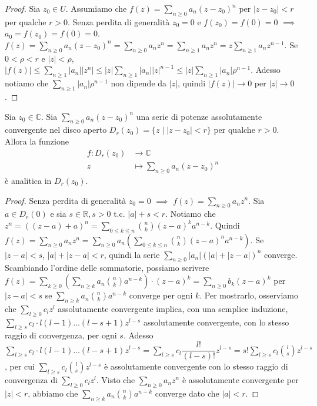 \begin{proof}
  Sia $z_0 \in U$. Assumiamo che $\displaystyle f(z)=\sum_{n \ge 0}a_n(z-z_0)^n$ per $|z-z_0|<r$ per qualche $r>0$. Senza perdita di generalità $z_0=0$ e $f(z_0)=f(0)=0$ $\implies$ $a_0=f(z_0)=f(0)=0$.
  $\displaystyle f(z)=\sum_{n \ge 0} a_n(z-z_0)^n=\sum_{n \ge 0} a_nz^n=\sum_{n \ge 1} a_nz^n=z\sum_{n \ge 1} a_nz^{n-1}$. Se $0<\rho<r$ e $|z|<\rho$, $\displaystyle |f(z)| \le \sum_{n \ge 1} |a_n||z^n| \le |z| \sum_{n \ge 1} |a_n||z|^{n-1} \le |z| \sum_{n \ge 1} |a_n| \rho^{n-1}$.
  Adesso notiamo che $\displaystyle \sum_{n \ge 1} |a_n| \rho^{n-1}$ non dipende da $|z|$, quindi $|f(z)| \longrightarrow 0$ per $|z| \longrightarrow 0$.
\end{proof}

\begin{prop}
  Sia $z_0 \in \mathbb{C}$. Sia $\displaystyle \sum_{n \ge 0} a_n(z-z_0)^n$ una serie di potenze assolutamente convergente nel disco aperto $D_r(z_0)=\{z \mid |z-z_0|<r\}$ per qualche $r>0$. Allora la funzione
  \begin{align*}
    f:D_r(z_0) &\longrightarrow \mathbb{C}\\
    z &\longmapsto \sum_{n \ge 0} a_n(z-z_0)^n
  \end{align*}
  è analitica in $D_r(z_0)$.
\end{prop}

\begin{proof}
  Senza perdita di generalità $z_0=0$ $\implies$ $\displaystyle f(z)=\sum_{n \ge 0} a_nz^n$. Sia $a \in D_r(0)$ e sia $s \in \mathbb{R}, s>0$ t.c. $|a|+s<r$. Notiamo che $\displaystyle z^n=((z-a)+a)^n=\displaystyle \sum_{0 \le k \le n} \binom{n}{k}(z-a)^ka^{n-k}$.
  Quindi $\displaystyle f(z)=\sum_{n \ge 0} a_nz^n=\sum_{n \ge 0} a_n\left(\sum_{0 \le k \le n} \binom{n}{k}(z-a)^na^{n-k}\right)$. Se $|z-a|<s$, $|a|+|z-a|<r$, quindi la serie $\displaystyle \sum_{n \ge 0} |a_n|(|a|+|z-a|)^n$ converge.
  Scambiando l'ordine delle sommatorie, possiamo scrivere $\displaystyle f(z)=\sum_{k \ge 0} \left(\sum_{n \ge k} a_n\binom{n}{k}a^{n-k}\right)\cdot (z-a)^k=\sum_{n \ge 0}b_k(z-a)^k$ per $|z-a|<s$ se $\displaystyle \sum_{n \ge k} a_n\binom{n}{k}a^{n-k}$ converge per ogni $k$.
  Per mostrarlo, osserviamo che $\displaystyle \sum_{l \ge 0} c_lz^l$ assolutamente convergente implica, con una semplice induzione, $\displaystyle \sum_{l \ge s} c_l\cdot l(l-1)\dots(l-s+1)z^{l-s}$ assolutamente convergente, con lo stesso raggio di convergenza, per ogni $s$.
  Adesso $\displaystyle \sum_{l \ge s} c_l\cdot l(l-1)\dots(l-s+1)z^{l-s}=\sum_{l \ge s} c_l\dfrac{l!}{(l-s)!}z^{l-s}=s! \sum_{l \ge s} c_l\binom{l}{s}z^{l-s}$, per cui $\displaystyle \sum_{l \ge s} c_l\binom{l}{s}z^{l-s}$ è assolutamente convergente con lo stesso raggio di convergenza di $\displaystyle \sum_{l \ge 0} c_lz^l$.
  Visto che $\displaystyle \sum_{n \ge 0} a_nz^n$ è assolutamente convergente per $|z|<r$, abbiamo che $\displaystyle \sum_{n \ge k} a_n\binom{n}{k}a^{n-k}$ converge dato che $|a|<r$.
\end{proof}

